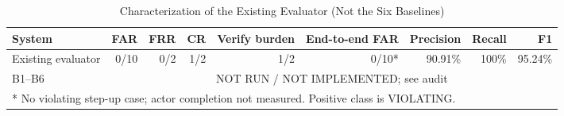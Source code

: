 \begin{table}[t]
\caption{Characterization of the Existing Evaluator (Not the Six Baselines)}
\label{tab:mcac-characterization}
\centering
\begin{tabular}{lrrrrrrrr}
\hline
System & FAR & FRR & CR & Verify burden & End-to-end FAR & Precision & Recall & F1 \\
\hline
Existing evaluator & 0/10 & 0/2 & 1/2 & 1/2 & 0/10* & 90.91\% & 100\% & 95.24\% \\
B1--B6 & \multicolumn{8}{c}{NOT RUN / NOT IMPLEMENTED; see audit} \\
\hline
\multicolumn{9}{l}{* No violating step-up case; actor completion not measured. Positive class is VIOLATING.}
\end{tabular}
\end{table}
